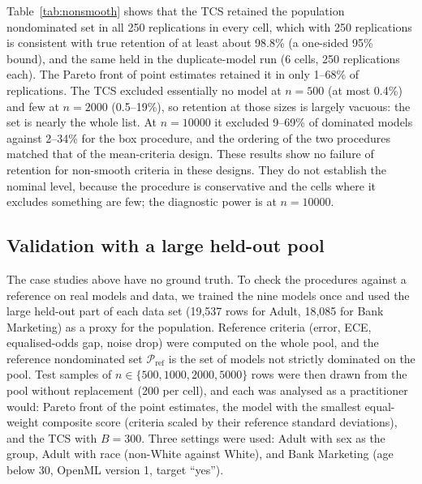 \documentclass[11pt,a4paper]{article}
\begin{document}
Table~\ref{tab:nonsmooth} shows that the TCS retained the population nondominated set in all 250 replications in every cell, which with 250 replications is consistent with true retention of at least about 98.8\% (a one-sided 95\% bound), and the same held in the duplicate-model run (6 cells, 250 replications each). The Pareto front of point estimates retained it in only 1--68\% of replications. The TCS excluded essentially no model at $n=500$ (at most 0.4\%) and few at $n=2000$ (0.5--19\%), so retention at those sizes is largely vacuous: the set is nearly the whole list. At $n=10000$ it excluded 9--69\% of dominated models against 2--34\% for the box procedure, and the ordering of the two procedures matched that of the mean-criteria design. These results show no failure of retention for non-smooth criteria in these designs. They do not establish the nominal level, because the procedure is conservative and the cells where it excludes something are few; the diagnostic power is at $n=10000$.

\begin{table}[h]\centering\small
\caption{Non-smooth criteria (error, ECE, equalised-odds gap): 12 models, 250 replications per row. Retention: probability that all population-nondominated models are retained. Exclusion: share of dominated models removed. Box: Bonferroni boxes with bootstrap standard errors; Naive: Pareto front of point estimates.}\label{tab:nonsmooth}

\end{table}

\subsection{Validation with a large held-out pool}\label{sec:realval}
The case studies above have no ground truth. To check the procedures against a reference on real models and data, we trained the nine models once and used the large held-out part of each data set (19,537 rows for Adult, 18,085 for Bank Marketing) as a proxy for the population. Reference criteria (error, ECE, equalised-odds gap, noise drop) were computed on the whole pool, and the reference nondominated set $\mathcal{P}_{\mathrm{ref}}$ is the set of models not strictly dominated on the pool. Test samples of $n\in\{500,1000,2000,5000\}$ rows were then drawn from the pool without replacement (200 per cell), and each was analysed as a practitioner would: Pareto front of the point estimates, the model with the smallest equal-weight composite score (criteria scaled by their reference standard deviations), and the TCS with $B=300$. Three settings were used: Adult with sex as the group, Adult with race (non-White against White), and Bank Marketing (age below 30, OpenML version 1, target ``yes'').
\end{document}

